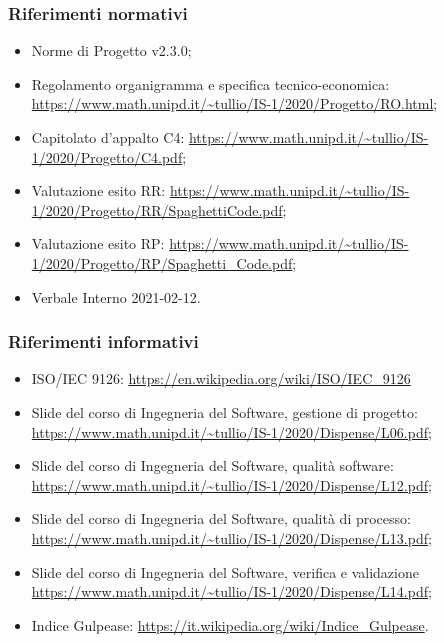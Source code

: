 \documentclass[../piano_di_qualifica.tex]{subfiles}
\begin{document}
\subsubsection{Riferimenti normativi}
\begin{itemize}
	\item Norme di Progetto v2.3.0;
	\item Regolamento organigramma e specifica tecnico-economica: \url{https://www.math.unipd.it/~tullio/IS-1/2020/Progetto/RO.html};
	\item Capitolato d’appalto C4: \url{https://www.math.unipd.it/~tullio/IS-1/2020/Progetto/C4.pdf};
	\item Valutazione esito RR: \url{https://www.math.unipd.it/~tullio/IS-1/2020/Progetto/RR/SpaghettiCode.pdf};
	\item Valutazione esito RP: \url{https://www.math.unipd.it/~tullio/IS-1/2020/Progetto/RP/Spaghetti_Code.pdf};
	\item Verbale Interno 2021-02-12.
\end{itemize}

\subsubsection{Riferimenti informativi}

\begin{itemize}
	\item ISO/IEC 9126: \url{https://en.wikipedia.org/wiki/ISO/IEC_9126}
	\item Slide del corso di Ingegneria del Software, gestione di progetto: \url{https://www.math.unipd.it/~tullio/IS-1/2020/Dispense/L06.pdf};
	\item Slide del corso di Ingegneria del Software, qualità software: \url{https://www.math.unipd.it/~tullio/IS-1/2020/Dispense/L12.pdf};
	\item Slide del corso di Ingegneria del Software, qualità di processo: \url{https://www.math.unipd.it/~tullio/IS-1/2020/Dispense/L13.pdf};
	\item Slide del corso di Ingegneria del Software, verifica e validazione \url{https://www.math.unipd.it/~tullio/IS-1/2020/Dispense/L14.pdf};
	\item Indice Gulpease: \url{https://it.wikipedia.org/wiki/Indice_Gulpease}.
\end{itemize}
\end{document}

